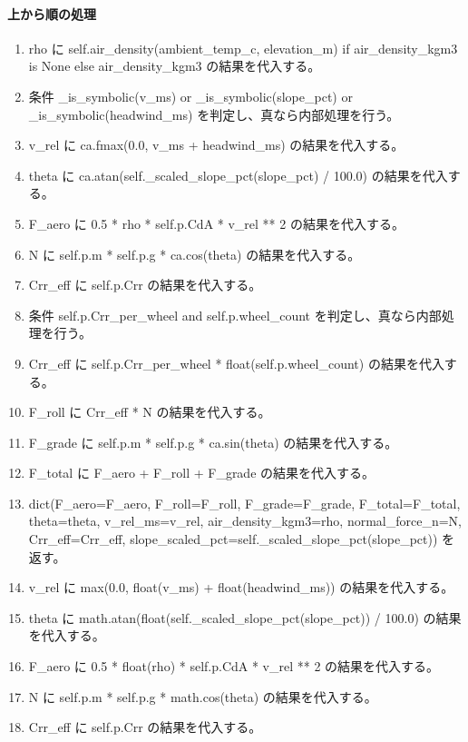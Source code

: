 \documentclass[a4paper,11pt]{article}
\begin{document}
            \paragraph{上から順の処理}
            \begin{enumerate}[leftmargin=1.8em]
            \item rho に self.air\_density(ambient\_temp\_c, elevation\_m) if air\_density\_kgm3 is None else air\_density\_kgm3 の結果を代入する。
\item 条件 \_is\_symbolic(v\_ms) or \_is\_symbolic(slope\_pct) or \_is\_symbolic(headwind\_ms) を判定し、真なら内部処理を行う。
\item   v\_rel に ca.fmax(0.0, v\_ms + headwind\_ms) の結果を代入する。
\item   theta に ca.atan(self.\_scaled\_slope\_pct(slope\_pct) / 100.0) の結果を代入する。
\item   F\_aero に 0.5 * rho * self.p.CdA * v\_rel ** 2 の結果を代入する。
\item   N に self.p.m * self.p.g * ca.cos(theta) の結果を代入する。
\item   Crr\_eff に self.p.Crr の結果を代入する。
\item   条件 self.p.Crr\_per\_wheel and self.p.wheel\_count を判定し、真なら内部処理を行う。
\item     Crr\_eff に self.p.Crr\_per\_wheel * float(self.p.wheel\_count) の結果を代入する。
\item   F\_roll に Crr\_eff * N の結果を代入する。
\item   F\_grade に self.p.m * self.p.g * ca.sin(theta) の結果を代入する。
\item   F\_total に F\_aero + F\_roll + F\_grade の結果を代入する。
\item   dict(F\_aero=F\_aero, F\_roll=F\_roll, F\_grade=F\_grade, F\_total=F\_total, theta=theta, v\_rel\_ms=v\_rel, air\_density\_kgm3=rho, normal\_force\_n=N, Crr\_eff=Crr\_eff, slope\_scaled\_pct=self.\_scaled\_slope\_pct(slope\_pct)) を返す。
\item v\_rel に max(0.0, float(v\_ms) + float(headwind\_ms)) の結果を代入する。
\item theta に math.atan(float(self.\_scaled\_slope\_pct(slope\_pct)) / 100.0) の結果を代入する。
\item F\_aero に 0.5 * float(rho) * self.p.CdA * v\_rel ** 2 の結果を代入する。
\item N に self.p.m * self.p.g * math.cos(theta) の結果を代入する。
\item Crr\_eff に self.p.Crr の結果を代入する。

\end{enumerate}
\end{document}
